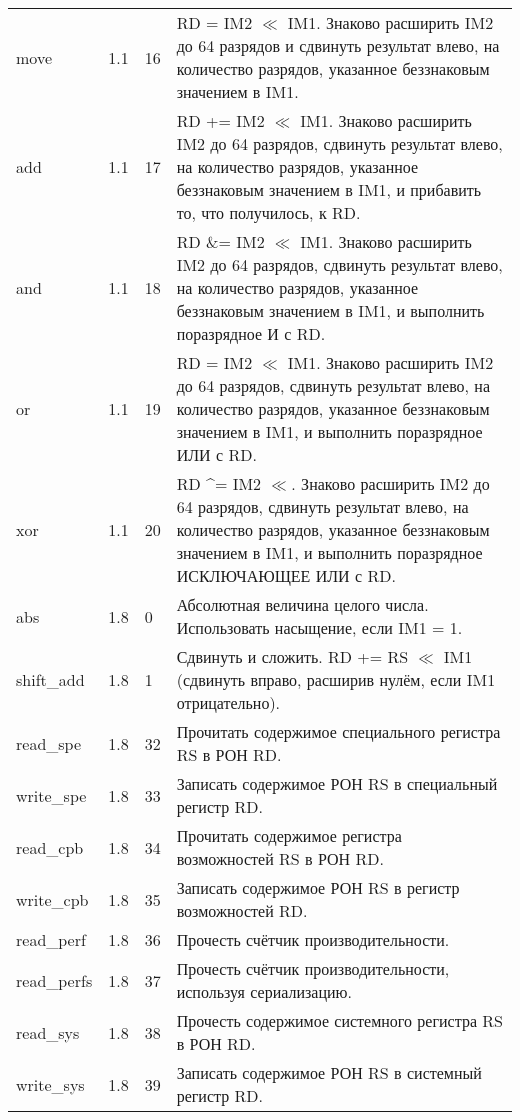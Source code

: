 \documentclass[forwardcom.tex]{subfiles}
\begin{document}
\begin{longtable} {|p{23mm}|p{15mm}|p{9mm}|p{99mm}|}
move              & 1.1   & 16 & RD = IM2 $\ll$ IM1. Знаково расширить IM2 до 64 разрядов и сдвинуть результат влево, на количество разрядов, указанное беззнаковым значением в IM1. \\
add               & 1.1   & 17 & RD += IM2 $\ll$ IM1. Знаково расширить IM2 до 64 разрядов, сдвинуть результат влево, на количество разрядов, указанное беззнаковым значением в IM1, и прибавить то, что получилось, к RD. \\
and               & 1.1   & 18 & RD \&= IM2 $\ll$ IM1. Знаково расширить IM2 до 64 разрядов, сдвинуть результат влево, на количество разрядов, указанное беззнаковым значением в IM1, и выполнить поразрядное И с RD. \\
or                & 1.1   & 19 & RD \textbar{}= IM2 $\ll$ IM1. Знаково расширить IM2 до 64 разрядов, сдвинуть результат влево, на количество разрядов, указанное беззнаковым значением в IM1, и выполнить поразрядное ИЛИ с RD. \\
xor               & 1.1   & 20 & RD \^{}= IM2 $\ll$. Знаково расширить IM2 до 64 разрядов, сдвинуть результат влево, на количество разрядов, указанное беззнаковым значением в IM1, и выполнить поразрядное ИСКЛЮЧАЮЩЕЕ ИЛИ с RD. \\
abs               & 1.8   &  0 & Абсолютная величина целого числа. Использовать насыщение, если IM1 = 1. \\
shift\_add        & 1.8   &  1 & Сдвинуть и сложить. RD += RS $\ll$ IM1 (сдвинуть вправо, расширив нулём, если IM1 отрицательно). \\
read\_spe         & 1.8   & 32 & Прочитать содержимое специального регистра RS в РОН RD. \\
write\_spe        & 1.8   & 33 & Записать содержимое РОН RS в специальный регистр RD. \\
read\_cpb         & 1.8   & 34 & Прочитать содержимое регистра возможностей RS в РОН RD. \\
write\_cpb        & 1.8   & 35 & Записать содержимое РОН RS в регистр возможностей RD. \\
read\_perf        & 1.8   & 36 & Прочесть счётчик производительности. \\
read\_perfs       & 1.8   & 37 & Прочесть счётчик производительности, используя сериализацию. \\
read\_sys         & 1.8   & 38 & Прочесть содержимое системного регистра RS в РОН RD. \\
write\_sys        & 1.8   & 39 & Записать содержимое РОН RS в системный регистр RD. \\

\end{longtable}
\end{document}
